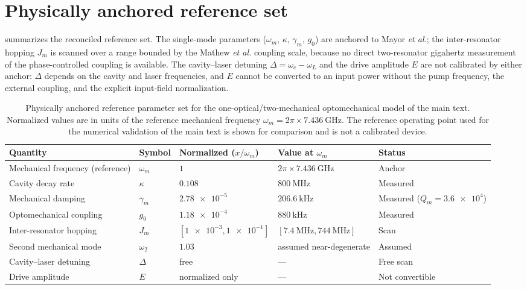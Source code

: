 \documentclass[aip,cha,reprint]{revtex4-2}
\begin{document}
\section{Physically anchored reference set}

 summarizes the reconciled reference set. The single-mode
parameters ($\omega_m$, $\kappa$, $\gamma_m$, $g_0$) are anchored to Mayor
\emph{et al.}; the inter-resonator hopping $J_m$ is scanned over a range bounded by the
Mathew \emph{et al.} coupling scale, because no direct two-resonator gigahertz
measurement of the phase-controlled coupling is available. The cavity--laser detuning
$\Delta=\omega_c-\omega_L$ and the drive amplitude $E$ are not calibrated by either
anchor: $\Delta$ depends on the cavity and laser frequencies, and $E$ cannot be
converted to an input power without the pump frequency, the external coupling, and the
explicit input-field normalization.

\begin{table}[h]
  \centering
  \caption{Physically anchored reference parameter set for the one-optical/two-mechanical
  optomechanical model of the main text. Normalized values are in units of the
  reference mechanical frequency $\omega_m=2\pi\times\SI{7.436}{\giga\hertz}$. The
  reference operating point used for the numerical validation of the main text is shown for
  comparison and is not a calibrated device.}
  \label{tab:si-calibrated}
  \begin{tabular}{@{}lllll@{}}
    \toprule
    Quantity & Symbol & Normalized ($x/\omega_m$) & Value at $\omega_m$ & Status \\
    \midrule
    Mechanical frequency (reference) & $\omega_m$ & $1$ & $2\pi\times\SI{7.436}{\giga\hertz}$ & Anchor \\
    Cavity decay rate & $\kappa$ & $\num{0.108}$ & $\SI{800}{\mega\hertz}$ & Measured \\
    Mechanical damping & $\gamma_m$ & $\num{2.78e-5}$ & $\SI{206.6}{\kilo\hertz}$ & Measured ($Q_m=\num{3.6e4}$) \\
    Optomechanical coupling & $g_0$ & $\num{1.18e-4}$ & $\SI{880}{\kilo\hertz}$ & Measured \\
    Inter-resonator hopping & $J_m$ & $[\num{1e-3},\num{1e-1}]$ & $[\SI{7.4}{\mega\hertz},\SI{744}{\mega\hertz}]$ & Scan \\
    \midrule
    Second mechanical mode & $\omega_2$ & $\num{1.03}$ & assumed near-degenerate & Assumed \\
    Cavity--laser detuning & $\Delta$ & free & --- & Free scan \\
    Drive amplitude & $E$ & normalized only & --- & Not convertible \\
    \bottomrule
  \end{tabular}
\end{table}
\end{document}
